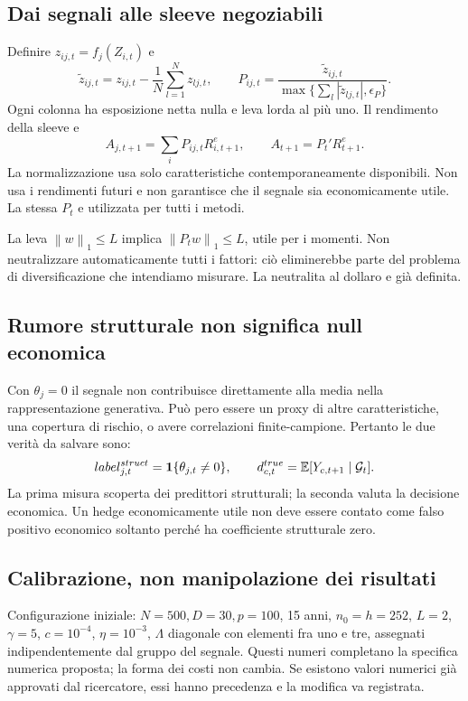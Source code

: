 \documentclass[11pt,a4paper]{article}
\theoremstyle{definition}\newtheorem{definition}[theorem]{Definizione}
\theoremstyle{remark}\newtheorem{remark}[theorem]{Osservazione}
\newcommand{\E}{\mathbb E}\newcommand{\PP}{\mathbb P}\newcommand{\R}{\mathbb R}
\newcommand{\norm}[1]{\left\lVert#1\right\rVert}\newcommand{\abs}[1]{\left|#1\right|}
\begin{document}
\subsection{Dai segnali alle sleeve negoziabili}
Definire $z_{ij,t}=f_j(Z_{i,t})$ e
\begin{equation}
 \widetilde z_{ij,t}=z_{ij,t}-\frac1N\sum_{l=1}^Nz_{lj,t},\qquad
 P_{ij,t}=\frac{\widetilde z_{ij,t}}{\max\{\sum_l|\widetilde z_{lj,t}|,\epsilon_P\}}.
\end{equation}
Ogni colonna ha esposizione netta nulla e leva lorda al più uno. Il rendimento della sleeve e
\begin{equation}
 A_{j,t+1}=\sum_iP_{ij,t}R^e_{i,t+1},\qquad A_{t+1}=P_t'R^e_{t+1}.
\end{equation}
La normalizzazione usa solo caratteristiche contemporaneamente disponibili. Non usa i rendimenti futuri e non garantisce che il segnale sia economicamente utile. La stessa $P_t$ e utilizzata per tutti i metodi.

La leva $\norm w_1\le L$ implica $\norm{P_tw}_1\le L$, utile per i momenti. Non neutralizzare automaticamente tutti i fattori: ciò eliminerebbe parte del problema di diversificazione che intendiamo misurare. La neutralita al dollaro e già definita.

\subsection{Rumore strutturale non significa null economica}
Con $\theta_j=0$ il segnale non contribuisce direttamente alla media nella rappresentazione generativa. Può pero essere un proxy di altre caratteristiche, una copertura di rischio, o avere correlazioni finite-campione. Pertanto le due verità da salvare sono:
\begin{equation}
 label^{struct}_{j,t}=\ind\{\theta_{j,t}\ne0\},\qquad
 d^{true}_{c,t}=\E[Y_{c,t+1}\mid\mathcal G_t].
\end{equation}
La prima misura scoperta dei predittori strutturali; la seconda valuta la decisione economica. Un hedge economicamente utile non deve essere contato come falso positivo economico soltanto perché ha coefficiente strutturale zero.

\subsection{Calibrazione, non manipolazione dei risultati}
Configurazione iniziale: $N=500,D=30,p=100$, 15 anni, $n_0=h=252$, $L=2$, $\gamma=5$, $c=10^{-4}$, $\eta=10^{-3}$, $\Lambda$ diagonale con elementi fra uno e tre, assegnati indipendentemente dal gruppo del segnale. Questi numeri completano la specifica numerica proposta; la forma dei costi non cambia. Se esistono valori numerici già approvati dal ricercatore, essi hanno precedenza e la modifica va registrata.
\end{document}
